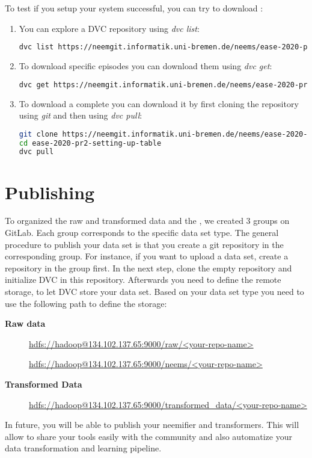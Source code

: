 To test if you setup your system successful, you can try to download \neems: 

\begin{enumerate}
	\item You can explore a DVC repository using \emph{dvc list}:
\begin{lstlisting}[language=bash, caption=Exploring a DVC repository using \emph{dvc list}]
dvc list https://neemgit.informatik.uni-bremen.de/neems/ease-2020-pr2-setting-up-table
\end{lstlisting}
	\item To download specific episodes you can download them using \emph{dvc get}:
\begin{lstlisting}[language=bash, caption=Downloading a episode using \emph{dvc get}]
dvc get https://neemgit.informatik.uni-bremen.de/neems/ease-2020-pr2-setting-up-table episodes/1599727087.4392.zip
\end{lstlisting}
	\item To download a complete \neem you can download it by first cloning the repository using \emph{git} and then using \emph{dvc pull}:
\begin{lstlisting}[language=bash, caption=Downloading a \neem using \emph{dvc pull}]
git clone https://neemgit.informatik.uni-bremen.de/neems/ease-2020-pr2-setting-up-table
cd ease-2020-pr2-setting-up-table
dvc pull
\end{lstlisting}
\end{enumerate}

\section{Publishing}
To organized the raw and transformed data and the \neems, we created 3 groups on GitLab.
Each group corresponds to the specific data set type.
The general procedure to publish your data set is that you create a git repository in the corresponding group.
For instance, if you want to upload a \neem data set, create a repository in the \neem group first.
In the next step, clone the empty repository and initialize DVC in this repository.
Afterwards you need to define the remote storage, to let DVC store your data set.
Based on your data set type you need to use the following path to define the storage:
 
\begin{description}
	\item[\textbf{Raw data}]\leavevmode \newline
		\url{hdfs://hadoop@134.102.137.65:9000/raw/<your-repo-name>}
	\item[\textbf{\neems}] \leavevmode \newline
		\url{hdfs://hadoop@134.102.137.65:9000/neems/<your-repo-name>}
	\item[\textbf{Transformed Data}] \leavevmode \newline
		\url{hdfs://hadoop@134.102.137.65:9000/transformed_data/<your-repo-name>}
\end{description}

In future, you will be able to publish your neemifier and transformers.
This will allow to share your tools easily with the community and also automatize your data transformation and learning pipeline.

